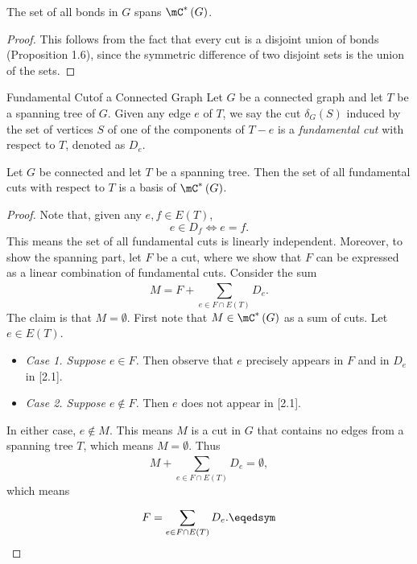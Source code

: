 \documentclass[co342]{subfiles}
\begin{document}
    \begin{prop}{}
        The set of all bonds in $G$ spans $\mC^{*}\left( G \right)$.
    \end{prop}

    \begin{proof}
        This follows from the fact that every cut is a disjoint union of bonds (Proposition 1.6), since the symmetric difference of two disjoint sets is the union of the sets.
    \end{proof}

    \begin{definition}{Fundamental Cut}{of a Connected Graph}
        Let $G$ be a connected graph and let $T$ be a spanning tree of $G$. Given any edge $e$ of $T$, we say the cut $\delta_G\left( S \right)$ induced by the set of vertices $S$ of one of the components of $T-e$ is a \emph{fundamental cut} with respect to $T$, denoted as $D_e$.
    \end{definition}

    \begin{prop}{}
        Let $G$ be connected and let $T$ be a spanning tree. Then the set of all fundamental cuts with respect to $T$ is a basis of $\mC^{*}\left( G \right)$.
    \end{prop}

    \begin{proof}
        Note that, given any $e,f\in E\left( T \right)$,
        \begin{equation*}
            e\in D_f \iff e=f.
        \end{equation*}
        This means the set of all fundamental cuts is linearly independent. Moreover, to show the spanning part, let $F$ be a cut, where we show that $F$ can be expressed as a linear combination of fundamental cuts. Consider the sum
        \begin{equation}
            M = F + \sum^{}_{e\in F\cap E\left( T \right)}D_e.
        \end{equation}
        The claim is that $M=\emptyset$. First note that $M\in\mC^{*}\left( G \right)$ as a sum of cuts. Let $e\in E\left( T \right)$.
        \begin{itemize}
            \item \textit{Case 1. Suppose $e\in F$.} Then observe that $e$ precisely appears in $F$ and in $D_e$ in [2.1]. 
            \item \textit{Case 2. Suppose $e\notin F$.} Then $e$ does not appear in [2.1]. 
        \end{itemize} 
        In either case, $e\notin M$. This means $M$ is a cut in $G$ that contains no edges from a spanning tree $T$, which means $M=\emptyset$. Thus
        \begin{equation*}
            M + \sum^{}_{e\in F\cap E\left( T \right)} D_e = \emptyset,
        \end{equation*}
        which means
        \begin{equation*}
            F = \sum^{}_{e\in F\cap E\left( T \right)} D_e. \eqedsym
        \end{equation*}
    \end{proof}
\end{document}
